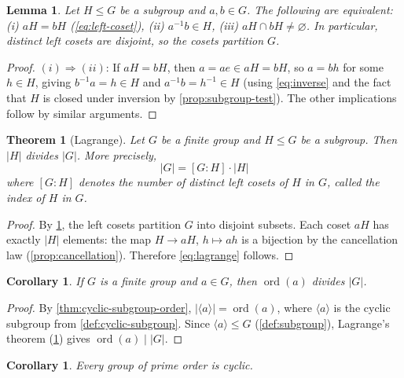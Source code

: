 \documentclass[12pt,a4paper]{article}
\theoremstyle{definition}
\theoremstyle{plain}
\newtheorem{theorem}[definition]{Theorem}
\newtheorem{corollary}[definition]{Corollary}
\newtheorem{lemma}[definition]{Lemma}
\theoremstyle{remark}
\newcommand{\ord}{\operatorname{ord}}
\begin{document}
\begin{lemma}\label{lem:coset-equality}
Let $H \leq G$ be a subgroup and $a, b \in G$.
The following are equivalent:
(i) $aH = bH$ (\cref{eq:left-coset}), \;
(ii) $a^{-1}b \in H$, \;
(iii) $aH \cap bH \neq \varnothing$.
In particular, distinct left cosets are disjoint, so the cosets partition $G$.
\end{lemma}

\begin{proof}
$(i) \Rightarrow (ii)$: If $aH = bH$, then $a = ae \in aH = bH$, so $a = bh$ for some
$h \in H$, giving $b^{-1}a = h \in H$ and $a^{-1}b = h^{-1} \in H$ (using
\cref{eq:inverse} and the fact that $H$ is closed under inversion by
\cref{prop:subgroup-test}).
The other implications follow by similar arguments.
\end{proof}

\begin{theorem}[Lagrange]\label{thm:lagrange}
Let $G$ be a finite group and $H \leq G$ be a subgroup.
Then $|H|$ divides $|G|$. More precisely,
\begin{equation}\label{eq:lagrange}
    |G| = [G : H] \cdot |H|
\end{equation}
where $[G : H]$ denotes the number of distinct left cosets of
$H$ in $G$, called the \emph{index} of $H$ in $G$.
\end{theorem}

\begin{proof}
By \cref{lem:coset-equality}, the left cosets partition $G$ into disjoint subsets.
Each coset $aH$ has exactly $|H|$ elements: the map $H \to aH$, $h \mapsto ah$ is a
bijection by the cancellation law (\cref{prop:cancellation}).
Therefore \cref{eq:lagrange} follows.
\end{proof}

\begin{corollary}\label{cor:order-divides}
If $G$ is a finite group and $a \in G$, then $\ord(a)$ divides $|G|$.
\end{corollary}

\begin{proof}
By \cref{thm:cyclic-subgroup-order}, $|\langle a \rangle| = \ord(a)$, where
$\langle a \rangle$ is the cyclic subgroup from \cref{def:cyclic-subgroup}.
Since $\langle a \rangle \leq G$ (\cref{def:subgroup}), Lagrange's theorem
(\cref{thm:lagrange}) gives $\ord(a) \mid |G|$.
\end{proof}

\begin{corollary}\label{cor:prime-cyclic}
Every group of prime order is cyclic.
\end{corollary}
\end{document}
